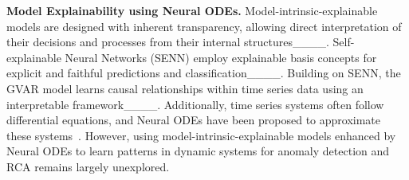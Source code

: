 \textbf{Model Explainability using Neural ODEs.} 
Model-intrinsic-explainable models are designed with inherent transparency, allowing direct interpretation of their decisions and processes from their internal structures____. Self-explainable Neural Networks (SENN) employ explainable basis concepts for explicit and faithful predictions and classification____. 
Building on SENN, the GVAR model learns causal relationships within time series data using an interpretable framework____. 
Additionally, time series systems often follow differential equations, and Neural ODEs have been proposed to approximate these systems~\cite { jia2019neural, asikis2022neural}. 
However, using model-intrinsic-explainable models enhanced by Neural ODEs to learn patterns in dynamic systems for anomaly detection and RCA remains largely unexplored.
